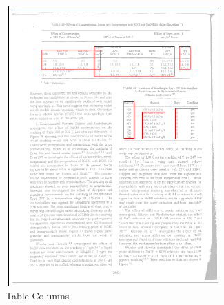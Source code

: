 \begin{figure}[H]
\begin{subfigure}{0.31\textwidth}
\includegraphics[width=\linewidth]{img/tableDetection/tableDetectionTabCols.pdf}
\caption{Table Columns} \label{fig:1c}
\end{subfigure}
\hspace*{\fill} %
\begin{subfigure}{0.31\textwidth}

\end{subfigure}
\end{figure}
